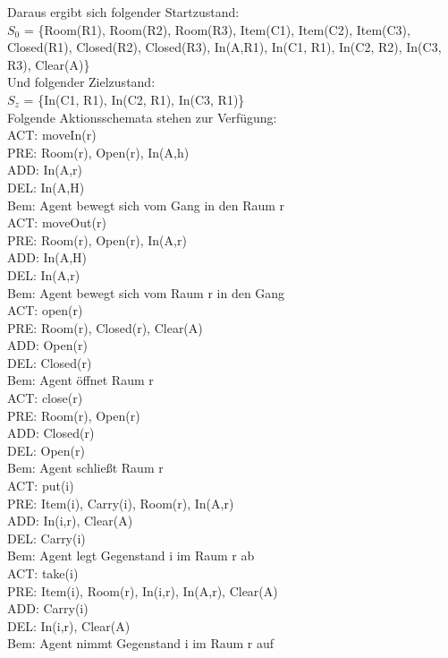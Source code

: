 \documentclass[a4paper]{article}
\begin{document}
Daraus ergibt sich folgender Startzustand:\\

$S_0$ = \{Room(R1), Room(R2), Room(R3), Item(C1), Item(C2), Item(C3), Closed(R1), Closed(R2), Closed(R3),
In(A,R1), In(C1, R1), In(C2, R2), In(C3, R3), Clear(A)\}\\

Und folgender Zielzustand:\\

$S_z$ = \{In(C1, R1), In(C2, R1), In(C3, R1)\}\\

Folgende Aktionsschemata stehen zur Verf\"ugung:\\

ACT: moveIn(r)\\
PRE: Room(r), Open(r), In(A,h)\\
ADD: In(A,r)\\
DEL: In(A,H)\\
Bem: Agent bewegt sich vom Gang in den Raum r\\

ACT: moveOut(r)\\
PRE: Room(r), Open(r), In(A,r)\\
ADD: In(A,H)\\
DEL: In(A,r)\\
Bem: Agent bewegt sich vom Raum r in den Gang\\

ACT: open(r)\\
PRE: Room(r), Closed(r), Clear(A)\\
ADD: Open(r)\\
DEL: Closed(r)\\
Bem: Agent \"offnet Raum r\\

ACT: close(r)\\
PRE: Room(r), Open(r)\\
ADD: Closed(r)\\
DEL: Open(r)\\
Bem: Agent schlie{\ss}t Raum r\\

ACT: put(i)\\
PRE: Item(i), Carry(i), Room(r), In(A,r)\\
ADD: In(i,r), Clear(A)\\
DEL: Carry(i)\\
Bem: Agent legt Gegenstand i im Raum r ab\\

ACT: take(i)\\
PRE: Item(i), Room(r), In(i,r), In(A,r), Clear(A)\\
ADD: Carry(i)\\
DEL: In(i,r), Clear(A)\\
Bem: Agent nimmt Gegenstand i im Raum r auf\\
\end{document}
